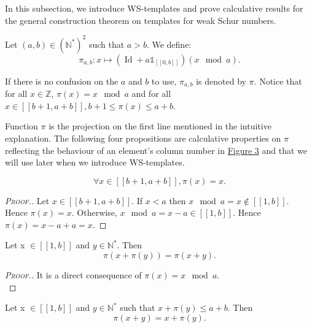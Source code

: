 In this subsection, we introduce WS-templates and prove calculative results for the general construction
theorem on templates for weak Schur numbers.

\begin{definition}
Let \((a,b) \in (\mathbb{N}^*)^2\) such that \(a>b\). We define:
\[ \pi_{a,b}:x \longmapsto (\operatorname{Id}+a\mathds{1}_{ [\![0,b]\!]})(x \mod a).\]
\end{definition}

\begin{sloppypar}
If there is no confusion on the \(a\) and \(b\) to use, \(\pi_{a, b}\) is denoted by \(\pi\). Notice that for all \(x \in \mathbb{Z}\), 
\({\pi(x) = x \mod a}\) and for all \(x \in [\![b + 1, a + b]\!], b + 1 \leqslant \pi(x) \leqslant a + b\).
\end{sloppypar}

\begin{sloppypar}
Function \(\pi\) is the projection on the first line mentioned in the intuitive explanation. The following four propositions are
calculative properties on \(\pi\) reflecting the behaviour of an element's column number in \hyperref[SchemaWS]{Figure 3} and
that we will use later when we introduce WS-templates.
\end{sloppypar}

\begin{proposition}
\label{prop1}
\[
\forall x \in [\![b + 1, a + b]\!], \pi(x) = x.
\]
\end{proposition}

\begin{proof}[\textsc{Proof.}]
\begin{sloppypar}
Let \(x \in [\![b + 1, a + b]\!]\). If \(x < a\) then \(x \mod a = x \notin [\![1, b]\!]\). Hence \(\pi(x) = x\).
Otherwise, \({x \mod a = x - a \in [\![1, b]\!]}\). Hence \({\pi(x) = x - a + a = x}\).
\end{sloppypar}
\end{proof}

\begin{proposition}
\label{prop2}
Let x \(\in [\![1,b]\!]\) and \(y \in \mathbb{N}^*\). Then
\[
\pi(x+\pi(y)) = \pi(x+y).
\]
\end{proposition}

\begin{proof}[\textsc{Proof.}]
It is a direct consequence of \(\pi(x) = x \mod a\). \\
\end{proof}

\begin{proposition}
\label{prop3}
Let x \(\in [\![1,b]\!]\) and \(y \in \mathbb{N}^*\) such that \(x+\pi(y) \leqslant a+b\). Then
\[
\pi(x+y)=x+\pi(y).
\]
\end{proposition}


